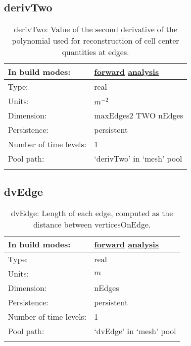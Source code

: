 \subsection[derivTwo]{derivTwo}
\label{subsec:var_sec_mesh_derivTwo}
\begin{center}
\begin{longtable}{| p{2.0in} | p{4.0in} |}
        \hline 
        In build modes: & \hyperref[subsec:forward_var_tab_mesh]{forward} \hyperref[subsec:analysis_var_tab_mesh]{analysis} \\
        \hline 
        Type: & real \\
        \hline 
        Units: & $m^{-2}$ \\
        \hline 
        Dimension: & maxEdges2 TWO nEdges \\
        \hline 
        Persistence: & persistent \\
        \hline 
        Number of time levels: & 1 \\
        \hline 
            Pool path: & `derivTwo' in `mesh' pool \\
		 \hline 
    \caption{derivTwo: Value of the second derivative of the polynomial used for reconstruction of cell center quantities at edges.}
\end{longtable}
\end{center}
\subsection[dvEdge]{dvEdge}
\label{subsec:var_sec_mesh_dvEdge}
\begin{center}
\begin{longtable}{| p{2.0in} | p{4.0in} |}
        \hline 
        In build modes: & \hyperref[subsec:forward_var_tab_mesh]{forward} \hyperref[subsec:analysis_var_tab_mesh]{analysis} \\
        \hline 
        Type: & real \\
        \hline 
        Units: & $m$ \\
        \hline 
        Dimension: & nEdges \\
        \hline 
        Persistence: & persistent \\
        \hline 
        Number of time levels: & 1 \\
        \hline 
            Pool path: & `dvEdge' in `mesh' pool \\
		 \hline 
    \caption{dvEdge: Length of each edge, computed as the distance between verticesOnEdge.}
\end{longtable}
\end{center}
